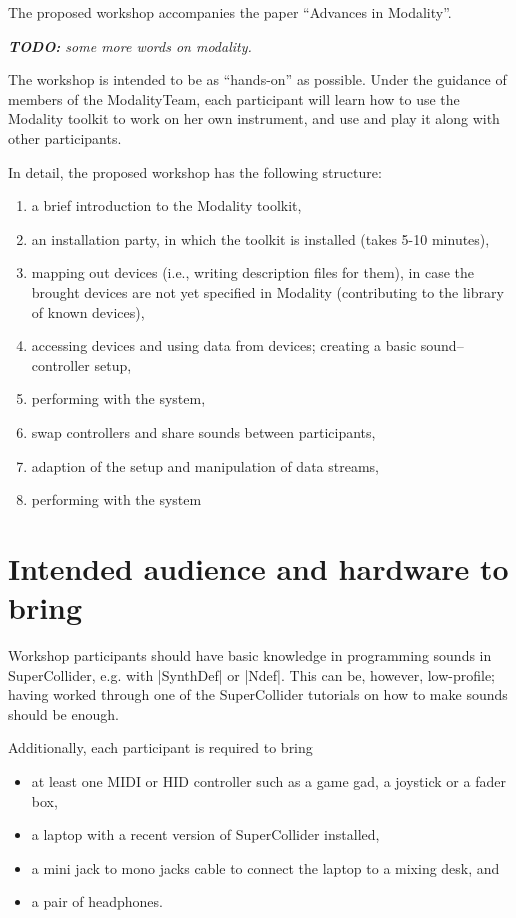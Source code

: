 \documentclass{article}
\newcommand{\todo}[1] {\emph{\textbf{TODO:} #1}}
\begin{document}
The proposed workshop accompanies the paper ``Advances in Modality''.

\todo{some more words on modality.}

The workshop is intended to be as “hands-­on” as possible.
Under the guidance of members of the ModalityTeam, each participant will learn how to use the Modality toolkit to work on her own instrument, and use and play it along with other participants.

In detail, the proposed workshop has the following structure:

\begin{enumerate}\itemsep0em
	\item a brief introduction to the Modality toolkit,
	\item an installation party, in which the toolkit is installed (takes 5-10 minutes),
	\item mapping out devices (i.e., writing description files for them), in case the brought devices are not yet specified in Modality (contributing to the library of known devices),
	\item accessing devices and using data from devices; creating a basic sound--controller setup,
	\item performing with the system,
	\item swap controllers and share sounds between participants,
	\item adaption of the setup and manipulation of data streams,
	\item performing with the system
\end{enumerate}


\section{Intended audience and hardware to bring}
\label{sec:participants}

Workshop participants should have basic knowledge in programming sounds in SuperCollider, e.g. with |SynthDef| or |Ndef|. 
This can be, however, low-profile; having worked through one of the SuperCollider tutorials on how to make sounds should be enough.

Additionally, each participant is required to bring
\begin{itemize}\itemsep0em
	\item at least one MIDI or HID controller such as a game gad, a joystick or a fader box, 
	\item a laptop with a recent version of SuperCollider installed, 
	\item a mini jack to mono jacks cable to connect the laptop to a mixing desk, and
	\item a pair of headphones.
\end{itemize}
\end{document}

